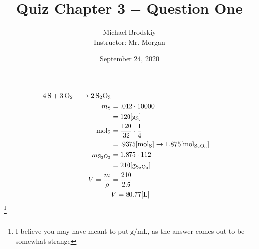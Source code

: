 \documentclass[12pt]{article}
\title{Quiz Chapter 3 $-$ Question One}
\date{September 24, 2020}
\author{Michael Brodskiy\\ \small Instructor: Mr. Morgan}
\begin{document}
\maketitle

\begin{equation}
  \begin{split}
    \ce{4S + 3O2 -> 2S2O3}\\
    m_{\ce{S}} & = .012\cdot10000 \\
    & = 120[\si{\gram}_{\ce{S}}] \\
    \si{\mole}_{\ce{S}} & = \frac{120}{32}\cdot\frac{1}{4} \\
  & = .9375[\si{\mole}_{\ce{S}}]\rightarrow 1.875[\si{\mole}_{\ce{S2O3}}] \\
  m_{\ce{S2O3}} & = 1.875\cdot112\\
  & = 210[\si{\gram}_{\ce{S2O3}}] \\
  V=\frac{m}{\rho} & = \frac{210}{2.6} \\
  & V=80.77[\si{\liter}]  
\end{split}
  \label{1}
\end{equation}\footnote{I believe you may have meant to put $\si{\gram\per\milli\liter}$, as the answer comes out to be somewhat strange}
\end{document}
